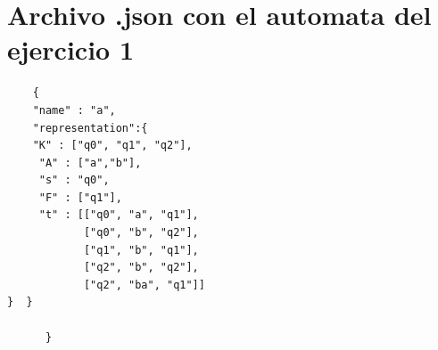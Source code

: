 \documentclass{article}
\begin{document}
\section{Archivo .json con el automata del ejercicio 1}

\begin{verbatim}
    {
    "name" : "a",
    "representation":{
    "K" : ["q0", "q1", "q2"],
     "A" : ["a","b"],
     "s" : "q0",
     "F" : ["q1"],
     "t" : [["q0", "a", "q1"],
            ["q0", "b", "q2"],
            ["q1", "b", "q1"],
            ["q2", "b", "q2"],
            ["q2", "ba", "q1"]]
}  }
            
      }
\end{verbatim}
\end{document}
